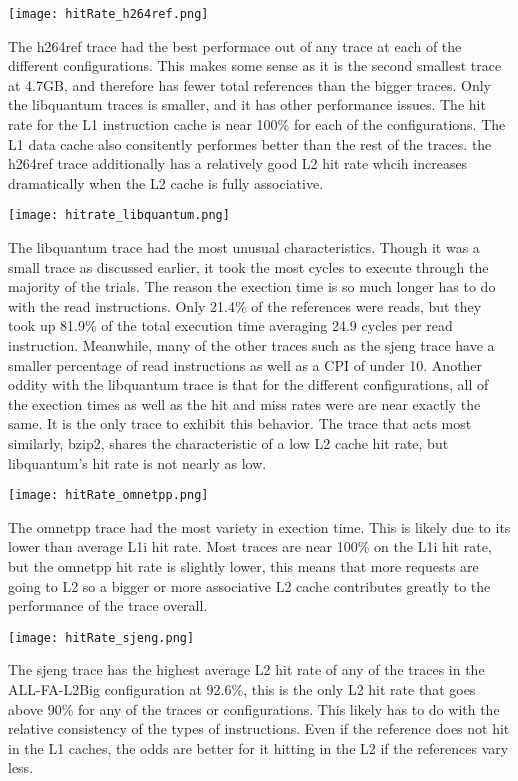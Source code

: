 \documentclass[cacheSimReport.tex]{subfiles}
\begin{document}
\hspace{-.9cm}\texttt{[image: hitRate\_h264ref.png]}

The h264ref trace had the best performace out of any trace at each of the different configurations. This makes some sense as it is the second smallest trace at 4.7GB, and therefore has fewer total references than the bigger traces. Only the libquantum traces is smaller, and it has other performance issues. The hit rate for the L1 instruction cache is near 100\% for each of the configurations. The L1 data cache also consitently performes better than the rest of the traces. the h264ref trace additionally has a relatively good L2 hit rate whcih increases dramatically when the L2 cache is fully associative.

\hspace{-.9cm}\texttt{[image: hitrate\_libquantum.png]}

The libquantum trace had the most unusual characteristics. Though it was a small trace as discussed earlier, it took the most cycles to execute through the majority of the trials. The reason the exection time is so much longer has to do with the read instructions. Only 21.4\% of the references were reads, but they took up 81.9\% of the total execution time averaging 24.9 cycles per read instruction. Meanwhile, many of the other traces such as the sjeng trace have a smaller percentage of read instructions as well as a CPI of under 10. Another oddity with the libquantum trace is that for the different configurations, all of the exection times as well as the hit and miss rates were are near exactly the same. It is the only trace to exhibit this behavior. The trace that acts most similarly, bzip2, shares the characteristic of a low L2 cache hit rate, but libquantum's hit rate is not nearly as low. 

\hspace{-.9cm}\texttt{[image: hitRate\_omnetpp.png]}

The omnetpp trace had the most variety in exection time. This is likely due to its lower than average L1i hit rate. Most traces are near 100\% on the L1i hit rate, but the omnetpp hit rate is slightly lower, this means that more requests are going to L2 so a bigger or more associative L2 cache contributes greatly to the performance of the trace overall.

\hspace{-.9cm}\texttt{[image: hitRate\_sjeng.png]}
 
The sjeng trace has the highest average L2 hit rate of any of the traces in the ALL-FA-L2Big configuration at 92.6\%, this is the only L2 hit rate that goes above 90\% for any of the traces or configurations. This likely has to do with the relative consistency of the types of instructions. Even if the reference does not hit in the L1 caches, the odds are better for it hitting in the L2 if the references vary less.
\end{document}
